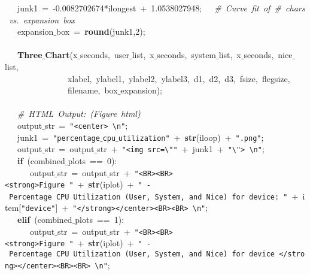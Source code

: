\mbox{}\ \ \ junk1\ =\ -0.0082702674*ilongest\ +\ 1.0538027948;\ \ \ \textit{\#\ Curve\ fit\ of\ \#\ chars\ vs.\ expansion\ box} \\
\mbox{}\ \ \ expansion$\_$box\ =\ \textbf{round}(junk1,2); \\
\mbox{}\ \ \  \\
\mbox{}\ \ \ \textbf{Three$\_$Chart}(x$\_$seconds,\ user$\_$list,\ x$\_$seconds,\ system$\_$list,\ x$\_$seconds,\ nice$\_$list, \\
\mbox{}\ \ \ \ \ \ \ \ \ \ \ \ \ \ \ xlabel,\ ylabel1,\ ylabel2,\ ylabel3,\ d1,\ d2,\ d3,\ fsize,\ flegsize, \\
\mbox{}\ \ \ \ \ \ \ \ \ \ \ \ \ \ \ filename,\ box$\_$expansion); \\
\mbox{}\ \ \  \\
\mbox{}\ \ \ \textit{\#\ HTML\ Output:\ (Figure\ html)} \\
\mbox{}\ \ \ output$\_$str\ =\ \texttt{"{}\textless{}center\textgreater{}\ \textbackslash{}n"{}}; \\
\mbox{}\ \ \ junk1\ =\ \texttt{"{}percentage$\_$cpu$\_$utilization"{}}\ +\ \textbf{str}(iloop)\ +\ \texttt{"{}.png"{}}; \\
\mbox{}\ \ \ output$\_$str\ =\ output$\_$str\ +\ \texttt{"{}\textless{}img\ src=\textbackslash{}"{}"{}}\ +\ junk1\ +\ \texttt{"{}\textbackslash{}"{}\textgreater{}\ \textbackslash{}n"{}}; \\
\mbox{}\ \ \ \textbf{if}\ (combined$\_$plots\ ==\ 0): \\
\mbox{}\ \ \ \ \ \ output$\_$str\ =\ output$\_$str\ +\ \texttt{"{}\textless{}BR\textgreater{}\textless{}BR\textgreater{}\textless{}strong\textgreater{}Figure\ "{}}\ +\ \textbf{str}(iplot)\ +\ \texttt{"{}\ -\ Percentage\ CPU\ Utilization\ (User,\ System,\ and\ Nice)\ for\ device:\ "{}}\ +\ item[\texttt{"{}device"{}}]\ +\ \texttt{"{}\textless{}/strong\textgreater{}\textless{}/center\textgreater{}\textless{}BR\textgreater{}\textless{}BR\textgreater{}\ \textbackslash{}n"{}}; \\
\mbox{}\ \ \ \textbf{elif}\ (combined$\_$plots\ ==\ 1): \\
\mbox{}\ \ \ \ \ \ output$\_$str\ =\ output$\_$str\ +\ \texttt{"{}\textless{}BR\textgreater{}\textless{}BR\textgreater{}\textless{}strong\textgreater{}Figure\ "{}}\ +\ \textbf{str}(iplot)\ +\ \texttt{"{}\ -\ Percentage\ CPU\ Utilization\ (User,\ System,\ and\ Nice)\ for\ device\ \textless{}/strong\textgreater{}\textless{}/center\textgreater{}\textless{}BR\textgreater{}\textless{}BR\textgreater{}\ \textbackslash{}n"{}}; \\
